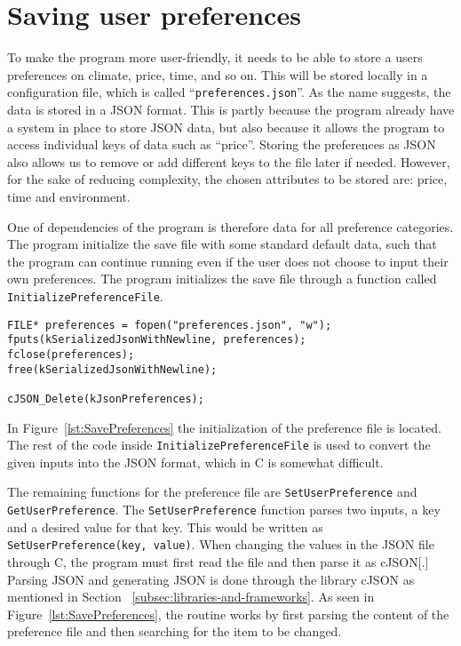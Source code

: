 \section{Saving user preferences}\label{sec:saving-user-preferences}

To make the program more user-friendly, it needs to be able to store a users preferences on climate, price,
time, and so on.
This will be stored locally in a configuration file, which is called ``\verb|preferences.json|''.
As the name suggests, the data is stored in a JSON format.
This is partly because the program already have a system in place to store JSON data, but also because it allows the
program to access individual keys of data such as ``price''.
Storing the preferences as JSON also allows us to remove or add different keys to the file later if needed.
However, for the sake of reducing complexity, the chosen attributes to be stored are: price, time and environment.

One of dependencies of the program is therefore data for all preference categories.
The program initialize the save file with some standard default data, such that the program can continue running even if
the user does not choose to input their own preferences.
The program initializes the save file through a function called \texttt{InitializePreferenceFile}.

\begin{lstlisting}[label={lst:SavePreferences}, caption={Saving preferences to file.}]
FILE* preferences = fopen("preferences.json", "w");
fputs(kSerializedJsonWithNewline, preferences);
fclose(preferences);
free(kSerializedJsonWithNewline);

cJSON_Delete(kJsonPreferences);
\end{lstlisting}

In Figure~\ref{lst:SavePreferences} the initialization of the preference file is located.
The rest of the code inside \texttt{InitializePreferenceFile} is used to convert the given inputs into the JSON format,
which in C is somewhat difficult.

The remaining functions for the preference file are \texttt{SetUserPreference} and \texttt{GetUserPreference}.
The \texttt{SetUserPreference} function parses two inputs, a key and a desired value for that key.
This would be written as \texttt{SetUserPreference(key, value)}.
When changing the values in the JSON file through C, the program must first read the file and then parse it as cJSON[.]
Parsing JSON and generating JSON is done through the library cJSON as mentioned in Section
~\ref{subsec:libraries-and-frameworks}.
As seen in Figure~\ref{lst:SavePreferences}, the routine works by first parsing the content of the preference file and
then searching for the item to be changed.

